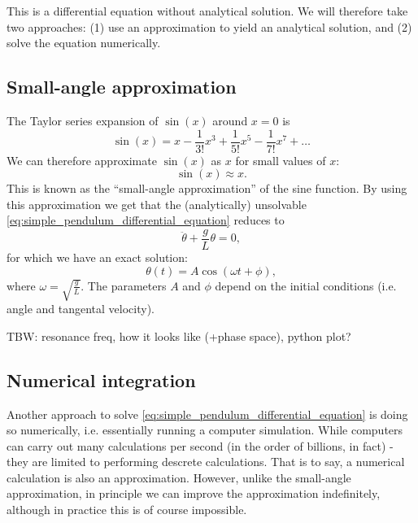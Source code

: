 This is a differential equation without analytical solution. We will therefore take two approaches: (1) use an approximation to yield an analytical solution, and (2) solve the equation numerically.

\subsection{Small-angle approximation}
The Taylor series expansion of $\sin(x)$ around $x=0$ is
\begin{equation}
	\sin(x) = x - \frac{1}{3!}x^{3} + \frac{1}{5!}x^{5} - \frac{1}{7!}x^{7} + \dots
	\label{eq:taylor_series_sin}
\end{equation}
We can therefore approximate $\sin(x)$ as $x$ for small values of $x$:
\begin{equation}
	\sin(x) \approx x.
	\label{eq:sin_small_angle_approx}
\end{equation}
This is known as the \enquote{small-angle approximation} of the sine function. By using this approximation we get that the (analytically) unsolvable \autoref{eq:simple_pendulum_differential_equation} reduces to
\begin{equation}
	\ddot{\theta} + \frac{g}{L}\theta = 0,
	\label{eq:simple_pendulum_small_angle_equation}
\end{equation}
for which we have an exact solution:
\begin{equation}
	\theta(t) = A\cos\left(\omega t+\phi\right),
	\label{eq:simple_pendulum_small_angle_solution}
\end{equation}
where $\omega=\sqrt{\frac{g}{L}}$. The parameters $A$ and $\phi$ depend on the initial conditions (i.e. angle and tangental velocity).

TBW: resonance freq, how it looks like (+phase space), python plot?

\subsection{Numerical integration}
Another approach to solve \autoref{eq:simple_pendulum_differential_equation} is doing so numerically, i.e. essentially running a computer simulation. While computers can carry out many calculations per second (in the order of billions, in fact) - they are limited to performing descrete calculations. That is to say, a numerical calculation is also an approximation. However, unlike the small-angle approximation, in principle we can improve the approximation indefinitely, although in practice this is of course impossible.

